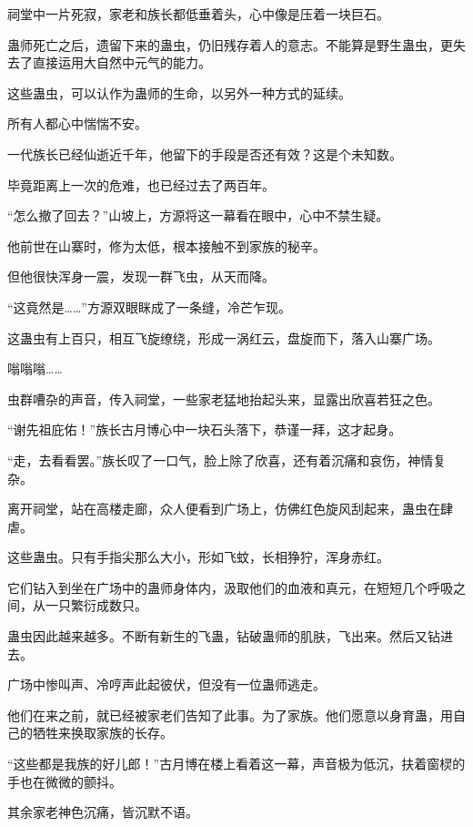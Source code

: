 
\begin{this_body}

祠堂中一片死寂，家老和族长都低垂着头，心中像是压着一块巨石。

蛊师死亡之后，遗留下来的蛊虫，仍旧残存着人的意志。不能算是野生蛊虫，更失去了直接运用大自然中元气的能力。

这些蛊虫，可以认作为蛊师的生命，以另外一种方式的延续。

所有人都心中惴惴不安。

一代族长已经仙逝近千年，他留下的手段是否还有效？这是个未知数。

毕竟距离上一次的危难，也已经过去了两百年。

“怎么撤了回去？”山坡上，方源将这一幕看在眼中，心中不禁生疑。

他前世在山寨时，修为太低，根本接触不到家族的秘辛。

但他很快浑身一震，发现一群飞虫，从天而降。

“这竟然是……”方源双眼眯成了一条缝，冷芒乍现。

这蛊虫有上百只，相互飞旋缭绕，形成一涡红云，盘旋而下，落入山寨广场。

嗡嗡嗡……

虫群嘈杂的声音，传入祠堂，一些家老猛地抬起头来，显露出欣喜若狂之色。

“谢先祖庇佑！”族长古月博心中一块石头落下，恭谨一拜，这才起身。

“走，去看看罢。”族长叹了一口气，脸上除了欣喜，还有着沉痛和哀伤，神情复杂。

离开祠堂，站在高楼走廊，众人便看到广场上，仿佛红色旋风刮起来，蛊虫在肆虐。

这些蛊虫。只有手指尖那么大小，形如飞蚊，长相狰狞，浑身赤红。

它们钻入到坐在广场中的蛊师身体内，汲取他们的血液和真元，在短短几个呼吸之间，从一只繁衍成数只。

蛊虫因此越来越多。不断有新生的飞蛊，钻破蛊师的肌肤，飞出来。然后又钻进去。

广场中惨叫声、冷哼声此起彼伏，但没有一位蛊师逃走。

他们在来之前，就已经被家老们告知了此事。为了家族。他们愿意以身育蛊，用自己的牺牲来换取家族的长存。

“这些都是我族的好儿郎！”古月博在楼上看着这一幕，声音极为低沉，扶着窗棂的手也在微微的颤抖。

其余家老神色沉痛，皆沉默不语。


\end{this_body}
